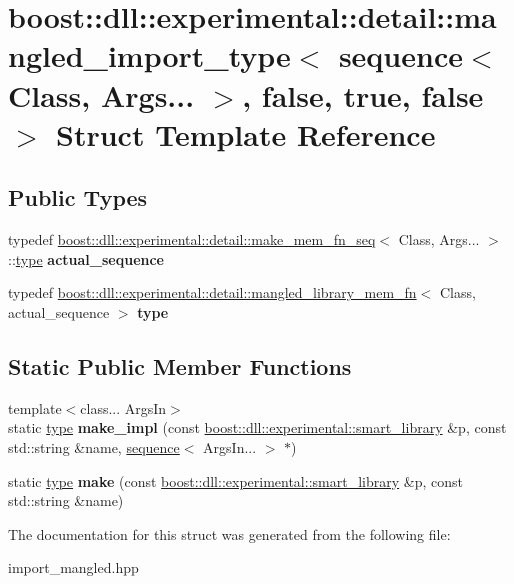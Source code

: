 \hypertarget{a00208}{}\section{boost\+:\+:dll\+:\+:experimental\+:\+:detail\+:\+:mangled\+\_\+import\+\_\+type$<$ sequence$<$ Class, Args... $>$, false, true, false $>$ Struct Template Reference}
\label{a00208}
\subsection*{Public Types}
\begin{DoxyCompactItemize}
\item 
typedef \hyperlink{a00199}{boost\+::dll\+::experimental\+::detail\+::make\+\_\+mem\+\_\+fn\+\_\+seq}$<$ Class, Args... $>$\+::\hyperlink{a00211}{type} {\bfseries actual\+\_\+sequence}\hypertarget{a00208_a406057ae53728fce5596c851c965bd9b}{}\label{a00208_a406057ae53728fce5596c851c965bd9b}

\item 
typedef \hyperlink{a00211}{boost\+::dll\+::experimental\+::detail\+::mangled\+\_\+library\+\_\+mem\+\_\+fn}$<$ Class, actual\+\_\+sequence $>$ {\bfseries type}\hypertarget{a00208_ac6258fdfdf5b8122a71ea2460bbc879b}{}\label{a00208_ac6258fdfdf5b8122a71ea2460bbc879b}

\end{DoxyCompactItemize}
\subsection*{Static Public Member Functions}
\begin{DoxyCompactItemize}
\item 
{\footnotesize template$<$class... Args\+In$>$ }\\static \hyperlink{a00211}{type} {\bfseries make\+\_\+impl} (const \hyperlink{a00281}{boost\+::dll\+::experimental\+::smart\+\_\+library} \&p, const std\+::string \&name, \hyperlink{a00266}{sequence}$<$ Args\+In... $>$ $\ast$)\hypertarget{a00208_a2e80b9257347fd592aea70c10d0d9d22}{}\label{a00208_a2e80b9257347fd592aea70c10d0d9d22}

\item 
static \hyperlink{a00211}{type} {\bfseries make} (const \hyperlink{a00281}{boost\+::dll\+::experimental\+::smart\+\_\+library} \&p, const std\+::string \&name)\hypertarget{a00208_aa5ecb76aa04d873ef520d01cc3bdbb7b}{}\label{a00208_aa5ecb76aa04d873ef520d01cc3bdbb7b}

\end{DoxyCompactItemize}


The documentation for this struct was generated from the following file\+:\begin{DoxyCompactItemize}
\item 
import\+\_\+mangled.\+hpp\end{DoxyCompactItemize}
